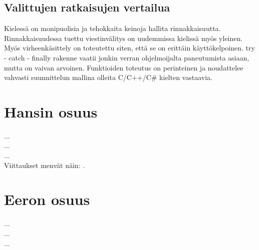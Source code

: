 \documentclass[11pt,oneside,a4paper]{article}
\begin{document}
\subsection{Valittujen ratkaisujen vertailua}
Kielessä on monipuolisia ja tehokkaita keinoja hallita rinnakkaisuutta. Rinnakkaisuudessa tuettu viestinvälitys on uudemmissa kielissä myös yleinen. Myös virheenkäsittely on toteutettu siten, että se on erittäin käyttökelpoinen. try - catch - finally rakenne vaatii jonkin verran ohjelmoijalta paneutumista asiaan, mutta on vaivan arvoinen. Funktioiden toteutus on perinteinen ja noudattelee vahvasti suunnittelun mallina olleita C/C++/C\# kielten vastaavia. 

\section{Hansin osuus}
... \\
... \\
... \\

Viittaukset menvät näin: \cite{ERL99}.

\section{Eeron osuus}
... \\
... \\
... \\
\end{document}
